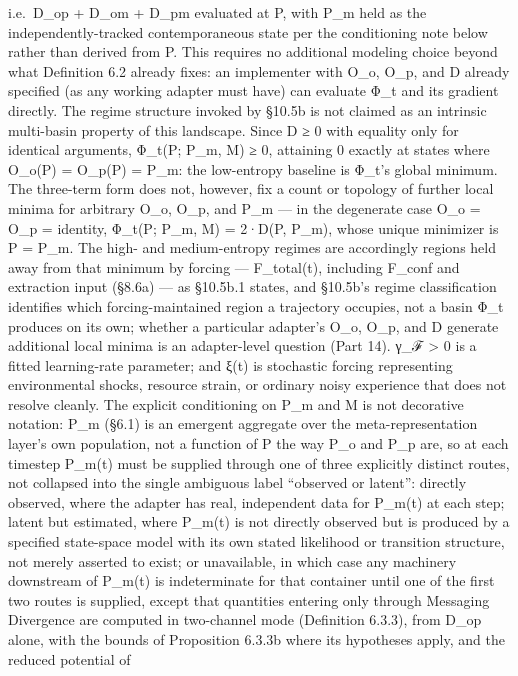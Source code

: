 \documentclass[
]{article}
\begin{document}
i.e.~D\_op + D\_om + D\_pm evaluated at P, with P\_m held as the
independently-tracked contemporaneous state per the conditioning note
below rather than derived from P. This requires no additional modeling
choice beyond what Definition 6.2 already fixes: an implementer with
O\_o, O\_p, and D already specified (as any working adapter must have)
can evaluate Φ\_t and its gradient directly. The regime structure
invoked by §10.5b is not claimed as an intrinsic multi-basin property of
this landscape. Since D ≥ 0 with equality only for identical arguments,
Φ\_t(P; P\_m, M) ≥ 0, attaining 0 exactly at states where O\_o(P) =
O\_p(P) = P\_m: the low-entropy baseline is Φ\_t's global minimum. The
three-term form does not, however, fix a count or topology of further
local minima for arbitrary O\_o, O\_p, and P\_m --- in the degenerate
case O\_o = O\_p = identity, Φ\_t(P; P\_m, M) = 2·D(P, P\_m), whose
unique minimizer is P = P\_m. The high- and medium-entropy regimes are
accordingly regions held away from that minimum by forcing ---
F\_total(t), including F\_conf and extraction input (§8.6a) --- as
§10.5b.1 states, and §10.5b's regime classification identifies which
forcing-maintained region a trajectory occupies, not a basin Φ\_t
produces on its own; whether a particular adapter's O\_o, O\_p, and D
generate additional local minima is an adapter-level question (Part 14).
γ\_ℱ \textgreater{} 0 is a fitted learning-rate parameter; and ξ(t) is
stochastic forcing representing environmental shocks, resource strain,
or ordinary noisy experience that does not resolve cleanly. The explicit
conditioning on P\_m and M is not decorative notation: P\_m (§6.1) is an
emergent aggregate over the meta-representation layer's own population,
not a function of P the way P\_o and P\_p are, so at each timestep
P\_m(t) must be supplied through one of three explicitly distinct
routes, not collapsed into the single ambiguous label ``observed or
latent'': directly observed, where the adapter has real, independent
data for P\_m(t) at each step; latent but estimated, where P\_m(t) is
not directly observed but is produced by a specified state-space model
with its own stated likelihood or transition structure, not merely
asserted to exist; or unavailable, in which case any machinery
downstream of P\_m(t) is indeterminate for that container until one of
the first two routes is supplied, except that quantities entering only
through Messaging Divergence are computed in two-channel mode
(Definition 6.3.3), from D\_op alone, with the bounds of Proposition
6.3.3b where its hypotheses apply, and the reduced potential of
\end{document}
